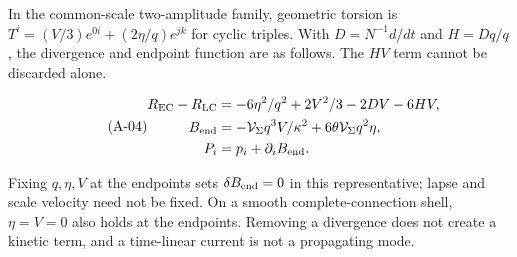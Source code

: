 In the common-scale two-amplitude family, geometric torsion is $T^i=(V/3)e^{0i}+(2\eta/q)e^{jk}$ for cyclic triples. With $D=N^{-1}d/dt$ and $H=Dq/q$, the divergence and endpoint function are as follows. The $HV$ term cannot be discarded alone.

\begin{equation}\tag{A-04}\label{eq:A-04}
\begin{aligned}R_{\rm EC}-R_{\rm LC}&=-6\eta^2/q^2+2V^2/3-2DV-6HV,\\ B_{\rm end}&=-\mathcal V_{\Sigma}q^3V/\kappa^2+6\theta\mathcal V_{\Sigma}q^2\eta,\\ P_i&=p_i+\partial_iB_{\rm end}.\end{aligned}
\end{equation}

Fixing $q,\eta,V$ at the endpoints sets $\delta B_{\rm end}=0$ in this representative; lapse and scale velocity need not be fixed. On a smooth complete-connection shell, $\eta=V=0$ also holds at the endpoints. Removing a divergence does not create a kinetic term, and a time-linear current is not a propagating mode.

